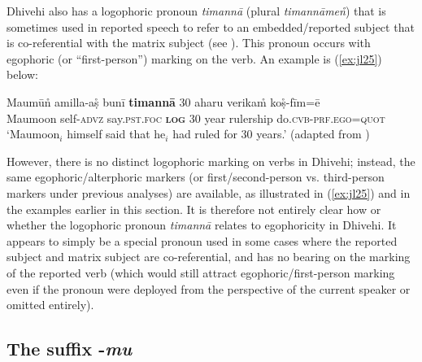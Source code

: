 \documentclass[output=paper]{langsci/langscibook}
\begin{document}

   Dhivehi also has a logophoric pronoun \textit{timannā} (plural \textit{timannāmen̊}) that is sometimes used in reported speech to refer to an embedded/reported subject that is co-referential with the matrix subject (see \citealt[96–97]{Gnanadesikan2017}). This pronoun occurs with egophoric (or “first-person”) marking on the verb. An example is (\ref{ex:jl25}) below:

\begin{exe}
	\ex 	\label{ex:jl25}
	\gll Maumūn̊ amilla-aṣ̊ bunī \textbf{timannā} 30 aharu verikam̊ koṣ̊-fīm=ē\\
	Maumoon self-\textsc{advz} say.\textsc{pst}.\textsc{foc} \textbf{\textsc{log}} 30 year rulership do.\textsc{cvb}-\textsc{prf}.\textsc{ego}=\textsc{quot}\\
	\trans ‘Maumoon$_i$ himself said that he$_i$ had ruled for 30 years.’ (adapted from \citealt[96]{Gnanadesikan2017})
\end{exe}


However, there is no distinct logophoric marking on verbs in Dhivehi; instead, the same egophoric/alterphoric markers (or first/second-person vs. third-person markers under previous analyses) are available, as illustrated in (\ref{ex:jl25}) and in the examples earlier in this section. It is therefore not entirely clear how or whether the logophoric pronoun \textit{timannā} relates to egophoricity in Dhivehi. It appears to simply be a special pronoun used in some cases where the reported subject and matrix subject are co-referential, and has no bearing on the marking of the reported verb (which would still attract egophoric/first-person marking even if the pronoun were deployed from the perspective of the current speaker or omitted entirely).


\subsection{The suffix -\textit{mu}}\label{s:jl3-4}
\end{document}
